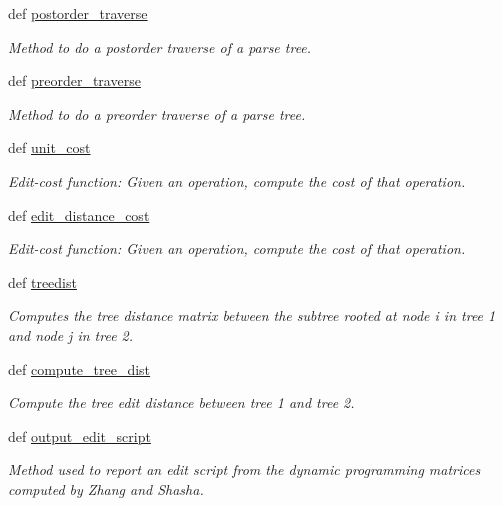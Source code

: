 \begin{DoxyCompactItemize}
def \hyperlink{classxutools_1_1distances_1_1_zhang_shasha_tree_dist_a62b5dbe0d1dbae497795f6be73ad0016}{postorder\-\_\-traverse}
\begin{DoxyCompactList}\small\item\em Method to do a postorder traverse of a parse tree. \end{DoxyCompactList}\item 
def \hyperlink{classxutools_1_1distances_1_1_zhang_shasha_tree_dist_a2b7f8a6b3c9b3ea6070966870bbdc6fa}{preorder\-\_\-traverse}
\begin{DoxyCompactList}\small\item\em Method to do a preorder traverse of a parse tree. \end{DoxyCompactList}\item 
def \hyperlink{classxutools_1_1distances_1_1_zhang_shasha_tree_dist_a80ae16ae164243f0f122efbe2f3dc19c}{unit\-\_\-cost}
\begin{DoxyCompactList}\small\item\em Edit-\/cost function\-: Given an operation, compute the cost of that operation. \end{DoxyCompactList}\item 
def \hyperlink{classxutools_1_1distances_1_1_zhang_shasha_tree_dist_a196aaa54dedc734f043f9423f6f78cc6}{edit\-\_\-distance\-\_\-cost}
\begin{DoxyCompactList}\small\item\em Edit-\/cost function\-: Given an operation, compute the cost of that operation. \end{DoxyCompactList}\item 
def \hyperlink{classxutools_1_1distances_1_1_zhang_shasha_tree_dist_aa6b48b4fe2accbcf2e1c0ad74a224841}{treedist}
\begin{DoxyCompactList}\small\item\em Computes the tree distance matrix between the subtree rooted at node i in tree 1 and node j in tree 2. \end{DoxyCompactList}\item 
def \hyperlink{classxutools_1_1distances_1_1_zhang_shasha_tree_dist_a2f2aca0d6ff3d59fbeb05ea6fed3897d}{compute\-\_\-tree\-\_\-dist}
\begin{DoxyCompactList}\small\item\em Compute the tree edit distance between tree 1 and tree 2. \end{DoxyCompactList}\item 
def \hyperlink{classxutools_1_1distances_1_1_zhang_shasha_tree_dist_a02b0900889c701584275220e14dbbd06}{output\-\_\-edit\-\_\-script}
\begin{DoxyCompactList}\small\item\em Method used to report an edit script from the dynamic programming matrices computed by Zhang and Shasha. \end{DoxyCompactList}\end{DoxyCompactItemize}

